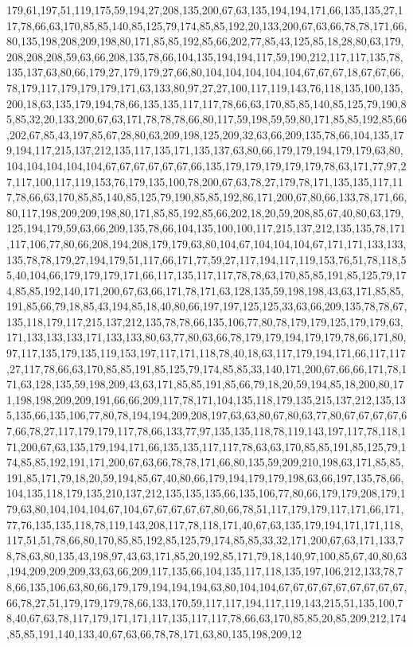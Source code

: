 179,61,197,51,119,175,59,194,27,208,135,200,67,63,135,194,194,171,66,135,135,27,117,78,66,63,170,85,85,140,85,125,79,174,85,85,192,20,133,200,67,63,66,78,78,171,66,80,135,198,208,209,198,80,171,85,85,192,85,66,202,77,85,43,125,85,18,28,80,63,179,208,208,208,59,63,66,208,135,78,66,104,135,194,194,117,59,190,212,117,117,135,78,135,137,63,80,66,179,27,179,179,27,66,80,104,104,104,104,104,67,67,67,18,67,67,66,78,179,117,179,179,179,171,63,133,80,97,27,27,100,117,119,143,76,118,135,100,135,200,18,63,135,179,194,78,66,135,135,117,117,78,66,63,170,85,85,140,85,125,79,190,85,85,32,20,133,200,67,63,171,78,78,78,66,80,117,59,198,59,59,80,171,85,85,192,85,66,202,67,85,43,197,85,67,28,80,63,209,198,125,209,32,63,66,209,135,78,66,104,135,179,194,117,215,137,212,135,117,135,171,135,137,63,80,66,179,179,194,179,179,63,80,104,104,104,104,104,67,67,67,67,67,67,66,135,179,179,179,179,179,78,63,171,77,97,27,117,100,117,119,153,76,179,135,100,78,200,67,63,78,27,179,78,171,135,135,117,117,78,66,63,170,85,85,140,85,125,79,190,85,85,192,86,171,200,67,80,66,133,78,171,66,80,117,198,209,209,198,80,171,85,85,192,85,66,202,18,20,59,208,85,67,40,80,63,179,125,194,179,59,63,66,209,135,78,66,104,135,100,100,117,215,137,212,135,135,78,171,117,106,77,80,66,208,194,208,179,179,63,80,104,67,104,104,104,67,171,171,133,133,135,78,78,179,27,194,179,51,117,66,171,77,59,27,117,194,117,119,153,76,51,78,118,55,40,104,66,179,179,179,171,66,117,135,117,117,78,78,63,170,85,85,191,85,125,79,174,85,85,192,140,171,200,67,63,66,171,78,171,63,128,135,59,198,198,43,63,171,85,85,191,85,66,79,18,85,43,194,85,18,40,80,66,197,197,125,125,33,63,66,209,135,78,78,67,135,118,179,117,215,137,212,135,78,78,66,135,106,77,80,78,179,179,125,179,179,63,171,133,133,133,171,133,133,80,63,77,80,63,66,78,179,179,194,179,179,78,66,171,80,97,117,135,179,135,119,153,197,117,171,118,78,40,18,63,117,179,194,171,66,117,117,27,117,78,66,63,170,85,85,191,85,125,79,174,85,85,33,140,171,200,67,66,66,171,78,171,63,128,135,59,198,209,43,63,171,85,85,191,85,66,79,18,20,59,194,85,18,200,80,171,198,198,209,209,191,66,66,209,117,78,171,104,135,118,179,135,215,137,212,135,135,135,66,135,106,77,80,78,194,194,209,208,197,63,63,80,67,80,63,77,80,67,67,67,67,67,66,78,27,117,179,179,117,78,66,133,77,97,135,135,118,78,119,143,197,117,78,118,171,200,67,63,135,179,194,171,66,135,135,117,117,78,63,63,170,85,85,191,85,125,79,174,85,85,192,191,171,200,67,63,66,78,78,171,66,80,135,59,209,210,198,63,171,85,85,191,85,171,79,18,20,59,194,85,67,40,80,66,179,194,179,179,198,63,66,197,135,78,66,104,135,118,179,135,210,137,212,135,135,135,66,135,106,77,80,66,179,179,208,179,179,63,80,104,104,104,67,104,67,67,67,67,67,80,66,78,51,117,179,179,117,171,66,171,77,76,135,135,118,78,119,143,208,117,78,118,171,40,67,63,135,179,194,171,171,118,117,51,51,78,66,80,170,85,85,192,85,125,79,174,85,85,33,32,171,200,67,63,171,133,78,78,63,80,135,43,198,97,43,63,171,85,20,192,85,171,79,18,140,97,100,85,67,40,80,63,194,209,209,209,33,63,66,209,117,135,66,104,135,117,118,135,197,106,212,133,78,78,66,135,106,63,80,66,179,179,194,194,194,63,80,104,104,67,67,67,67,67,67,67,67,67,66,78,27,51,179,179,179,78,66,133,170,59,117,117,194,117,119,143,215,51,135,100,78,40,67,63,78,117,179,171,171,117,135,117,117,78,66,63,170,85,85,20,85,209,212,174,85,85,191,140,133,40,67,63,66,78,78,171,63,80,135,198,209,12